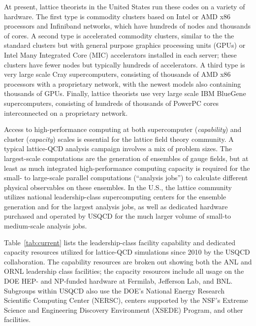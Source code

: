 At present, lattice theorists in the United States run these codes on a
variety of hardware.  The first type is commodity clusters based on Intel or AMD x86
processors and Infiniband networks, which have hundreds of nodes and
thousands of cores.  A second type is accelerated commodity clusters, similar to the the
standard clusters but with general purpose graphics processing units (GPUs) or
Intel Many Integrated Core (MIC) accelerators installed in each server; these
clusters have fewer nodes but typically hundreds of accelerators.  A third type is very
large scale Cray supercomputers, consisting of thousands of AMD x86 processors
with a proprietary network, with the newest models also containing thousands
of GPUs.  Finally, lattice theorists use very large scale IBM BlueGene supercomputers, consisting of
hundreds of thousands of PowerPC cores interconnected on a proprietary
network.

Access to high-performance computing at both supercomputer ({\em capability})
and cluster ({\em capacity}) scales is essential for the lattice field theory
community.  A typical lattice-QCD analysis campaign involves a mix of problem
sizes.  The largest-scale computations are the generation of ensembles of
gauge fields, but at least as much integrated high-performance computing
capacity is required for the small- to large-scale parallel computations
(``analysis jobs'') to calculate different physical observables on these
ensembles.  In the U.S., the lattice community utilizes national
leadership-class supercomputing centers for the ensemble generation and for
the largest analysis jobs, as well as dedicated hardware purchased and
operated by USQCD for the much larger volume of small-to medium-scale analysis
jobs.

Table~\ref{tab:current} lists the leadership-class facility
capability and dedicated capacity resources utilized
for lattice-QCD simulations since 2010 by the USQCD
collaboration.  The capability resources are broken out showing both the ANL
and ORNL leadership class facilities; the capacity resources include all usage
on the DOE HEP- and NP-funded hardware at
Fermilab, Jefferson Lab, and BNL.  Subgroups within USQCD also use the DOE's
National Energy Research Scientific Computing Center (NERSC), centers
supported by the NSF's Extreme Science and Engineering Discovery Environment
(XSEDE) Program, and other facilities.


